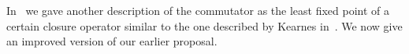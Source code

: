 \begin{comment}
  \begin{bmatrix} t(b,\bv) \\ t(b,\bv)  \end{bmatrix}}
{\begin{bmatrix} t(b,\bu) \\ t(b,\bu)  \end{bmatrix}
  \mathrel{\Delta_{\alpha, \beta}}
  \begin{bmatrix} t(a,\bu) \\ t(a,\bu)  \end{bmatrix}
  \mathrel{(\gamma \ast \gamma)}  %
  \begin{bmatrix} t(a,\bv) \\ t(a,\bv)  \end{bmatrix}
  \mathrel{\Delta_{\alpha, \beta}}
  \begin{bmatrix} t(b,\bv) \\ t(b,\bv)  \end{bmatrix}}
\]


Define
\begin{equation}
  \label{eq:6}
  \Phi_{\beta, \alpha}(\theta)
  = \{ (x,y) \in A^2 \mid
  (\exists\, (a,b) \in \theta)\,
\bigl(  (x,x) \mathrel{\Delta_{\beta, \alpha}} (a,a) \text{ and }
  (b,b) \mathrel{\Delta_{\beta, \alpha}} (y,y)\bigr)\}.
\end{equation}
It seems to me the statement ``$\gamma$ is
$\Delta_{\beta, \alpha}$-closed'' is equivalent to 
$\Phi_{\beta,\alpha}(\gamma)\subseteq \gamma$. However, it's not clear to me
that the commutator should
satisfy
$\Phi_{\beta,\alpha}\bigl([\alpha, \beta]\bigr) \subseteq [\alpha, \beta]$.


\end{comment}



In~\cite{com-fix-poi} we gave another description of the commutator
as the least fixed point of a certain closure operator similar 
to the one described by Kearnes
in~\cite[p.~930]{MR1358491}.
We now give an improved version of our earlier proposal.

